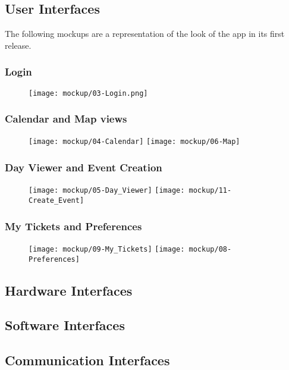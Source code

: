 \subsection{User Interfaces}
\label{subsect:User Interfaces}
	The following mockups are a representation of the look of the app in its first release.
	\subsubsection{Login}
	\begin{figure}[H]
	\texttt{[image: mockup/03-Login.png]}
	\centering 
	\end{figure}
	
	\subsubsection{Calendar and Map views}
	\begin{figure}[H]
	\texttt{[image: mockup/04-Calendar]}
	\hspace{2.5cm}
	\texttt{[image: mockup/06-Map]}
	\centering 
	\end{figure}
	
	\subsubsection{Day Viewer and Event Creation}
	\begin{figure}[H]
	\texttt{[image: mockup/05-Day\_Viewer]}
	\hspace{2.5cm}
	\texttt{[image: mockup/11-Create\_Event]}
	\centering 
	\end{figure}
	
	\subsubsection{My Tickets and Preferences}
	\begin{figure}[H]
	\texttt{[image: mockup/09-My\_Tickets]}
	\hspace{2.5cm}
	\texttt{[image: mockup/08-Preferences]}
	\centering 
	\end{figure}
\subsection{Hardware Interfaces}
\label{subsect:Hardware Interfaces}
\subsection{Software Interfaces}
\label{subsect:Software Interfaces}
\subsection{Communication Interfaces}
\label{subsect:Communication Interfaces}
